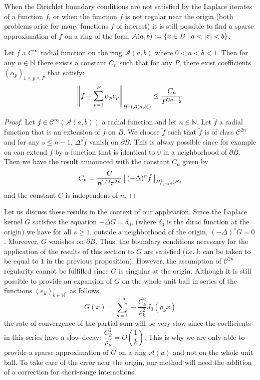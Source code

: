 \documentclass[11pt,a4paper]{article}
\begin{document}
When the Dirichlet boundary conditions are not satisfied by the Laplace iterates of a function $f$, or when the function $f$ is not regular near the origin (both problems arise for many functions $f$ of interest) it is still possible to find a sparse approximation of $f$ on a ring of the form  $\mathcal{A}(a,b) := \left\{x \in B\mathrel{}\middle|\mathrel{}a < |x| < b\right\}$: 
\begin{Prop} Let $f$ a $C^{\infty}$ radial function on the ring $\mathcal{A}(a,b)$ where $0<a<b<1$. Then for any $n \in \mathbb{N}$ there exists a constant $C_n$ such that for any $P$, there exist coefficients $(\alpha_p)_{1 \leq p \leq P}$ that satisfy: 
\[ \left\|f - \sum_{p=1}^P \alpha_p e_p\right\|_{H^1(\mathcal{A}(a,b))} \leq \dfrac{C_n}{P^{2n - \frac{1}{2}}}\]
\begin{proof}
Let $f \in \mathcal{C}^{\infty}\left(\mathcal{A}(a,b)\right)$ a radial function and let $n \in \mathbb{N}$. Let $\tilde{f}$ a radial function that is an extension of $f$ on $B$. We choose $\tilde{f}$ such that $\tilde{f}$ is of class $\mathcal{C}^{2n}$ and for any $s \leq n-1$, $\Delta^s \tilde{f}$ vanish on $\partial B$. This is alway possible since for example on can extend $f$ by a function that is identical to 0 in a neighborhood of $\partial B$. Then we have the result announced with the constant $C_n$ given by \[C_n = \dfrac{C}{n^{1/2}\pi^{2n}}\left\|(-\Delta)^n \tilde{f}\right\|_{H^1_{0,rad}(B)}\]  
and the constant $C$ is independent of $n$. 
\end{proof}
\end{Prop}

Let us discuss these results in the context of our application. Since the Laplace kernel $G$ satisfies the equation $-\Delta G = \delta_0$, (where $\delta_0$ is the dirac function at the origin) we have for all $s\geq 1$, outside a  neighborhood  of the origin, $(-\Delta)^s G =0$. Moreover, $G$ vanishes on $\partial B$. Thus, the boundary conditions necessary for the application of the results of this section to $G$ are satisfied (i.e. b can be taken to be equal to $1$ in the previous proposition). However, the assumption of $\mathcal{C}^{2n}$ regularity cannot be fulfilled since $G$ is singular at the origin. Although it is still possible to provide an expansion of $G$ on the whole unit ball in series of the functions $(e_k)_{k\in\mathbb{N}^*}$ as follows,
\[ G(x) = \sum_{p=1}^{+\infty} - \dfrac{C_k^2}{\rho_k^2} J_0(\rho_kx) \]
the rate of convergence of the partial sum will be very slow since the coefficients in this series have a slow decay: $\dfrac{C_k^2}{\rho_k^2} = O\left(\dfrac{1}{k}\right)$. This is why we are only able to provide a sparse approximation of $G$ on a ring $\mathcal{A}(a)$ and not on the whole unit ball. To take care of the error near the origin, our method will need the addition of a correction for short-range interactions. 
\end{document}
